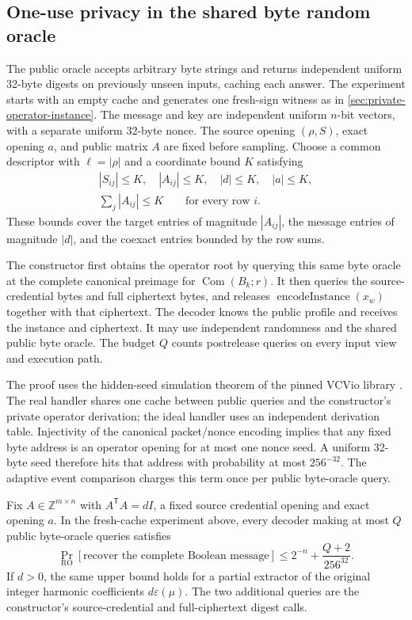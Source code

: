 \subsection{One-use privacy in the shared byte random oracle}
\label{sec:native-random-oracle}

The public oracle accepts arbitrary byte strings and returns independent
uniform 32-byte digests on previously unseen inputs, caching each answer.
The experiment starts with an empty cache and generates one fresh-sign
witness as in \cref{sec:private-operator-instance}. The message and key
are independent uniform \(n\)-bit vectors, with a separate uniform
32-byte nonce. The source opening \((\rho,S)\), exact opening \(a\), and
public matrix \(A\) are fixed before sampling. Choose a common descriptor with
\(\ell=|\rho|\) and a coordinate bound \(K\) satisfying
\[
\begin{gathered}
 |S_{ij}|\leq K,\quad |A_{ij}|\leq K,\quad |d|\leq K,\quad |a|\leq K,\\
 \sum_j |A_{ij}|\leq K\qquad\text{for every row }i.
\end{gathered}
\]
These bounds cover the target entries of magnitude \(|A_{ij}|\), the
message entries of magnitude \(|d|\), and the coexact entries bounded by
the row sums.

The constructor first obtains the operator root by querying this same byte
oracle at the complete canonical preimage for
\(\operatorname{Com}(B_k;r)\). It then queries the source-credential bytes
and full ciphertext bytes, and releases
\(\operatorname{encodeInstance}(x_w)\) together with that ciphertext.
The decoder knows the public profile and receives the instance and
ciphertext. It may use independent randomness and the shared public byte
oracle. The budget \(Q\) counts postrelease queries on every input view
and execution path.

The proof uses the hidden-seed simulation theorem of the pinned VCVio
library \cite{vcvio2026library}. The real handler shares one cache between
public queries and the constructor's private operator derivation; the ideal
handler uses an independent derivation table. Injectivity of the canonical
packet/nonce encoding implies that any fixed byte address is an operator
opening for at most one nonce seed. A uniform 32-byte seed therefore hits
that address with probability at most \(256^{-32}\). The adaptive event
comparison charges this term once per public byte-oracle query.

\begin{theorem}
\label{thm:coupled-native-rom}
Fix \(A\in\mathbb Z^{m\times n}\) with \(A^{\mathsf T}A=dI\), a fixed
source credential opening and exact opening \(a\). In the fresh-cache
experiment above, every decoder making at most \(Q\) public byte-oracle
queries satisfies
\[
 \Pr_{\mathrm{RO}}[\text{recover the complete Boolean message}]
 \leq 2^{-n}+\frac{Q+2}{256^{32}}.
\]
If \(d>0\), the same upper bound holds for a partial extractor of the
original integer harmonic coefficients \(d\varepsilon(\mu)\). The two additional
queries are the constructor's source-credential and full-ciphertext digest
calls.
\end{theorem}

